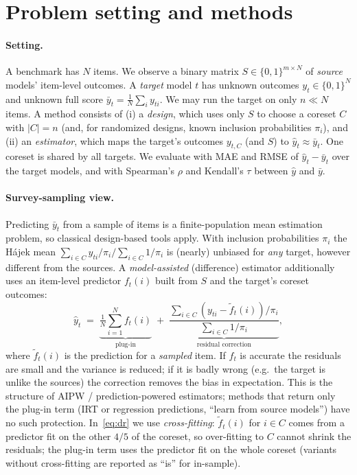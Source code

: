 \section{Problem setting and methods}
\label{sec:method}

\paragraph{Setting.}
A benchmark has $N$ items.  We observe a binary matrix $S\in\{0,1\}^{m\times N}$ of \emph{source} models' item-level outcomes.
A \emph{target} model $t$ has unknown outcomes $y_t\in\{0,1\}^N$ and unknown full score $\bar y_t=\frac1N\sum_i y_{ti}$.
We may run the target on only $n\ll N$ items.  A method consists of (i) a \emph{design}, which uses only $S$ to choose a
coreset $C$ with $|C|=n$ (and, for randomized designs, known inclusion probabilities $\pi_i$), and (ii) an \emph{estimator}, which maps the
target's outcomes $y_{t,C}$ (and $S$) to $\hat y_t\approx\bar y_t$.  One coreset is shared by all targets.
We evaluate with MAE and RMSE of $\hat y_t-\bar y_t$ over the target models, and with Spearman's $\rho$ and Kendall's $\tau$ between $\hat y$ and $\bar y$.

\paragraph{Survey-sampling view.}
Predicting $\bar y_t$ from a sample of items is a finite-population mean estimation problem, so classical design-based tools apply.
With inclusion probabilities $\pi_i$ the H\'ajek mean $\sum_{i\in C}y_{ti}/\pi_i\big/\sum_{i\in C}1/\pi_i$ is (nearly) unbiased for \emph{any} target, however different from the sources.
A \emph{model-assisted} (difference) estimator additionally uses an item-level predictor $f_t(i)$ built from $S$ and the target's coreset outcomes:
\begin{equation}
\hat y_t \;=\; \underbrace{\tfrac1N\textstyle\sum_{i=1}^N f_t(i)}_{\text{plug-in}} \;+\; \underbrace{\frac{\sum_{i\in C}(y_{ti}-\tilde f_t(i))/\pi_i}{\sum_{i\in C}1/\pi_i}}_{\text{residual correction}},
\label{eq:dr}
\end{equation}
where $\tilde f_t(i)$ is the prediction for a \emph{sampled} item.  If $f_t$ is accurate the residuals are small and the variance is reduced; if it is badly wrong (e.g.\ the target is unlike the sources) the correction removes the bias in expectation.
This is the structure of AIPW / prediction-powered estimators; methods that return only the plug-in term (IRT or regression predictions, ``learn from source models'') have no such protection.
In~\eqref{eq:dr} we use \emph{cross-fitting}: $\tilde f_t(i)$ for $i\in C$ comes from a predictor fit on the other $4/5$ of the coreset, so over-fitting to $C$ cannot shrink the residuals; the plug-in term uses the predictor fit on the whole coreset (variants without cross-fitting are reported as ``is'' for in-sample).

